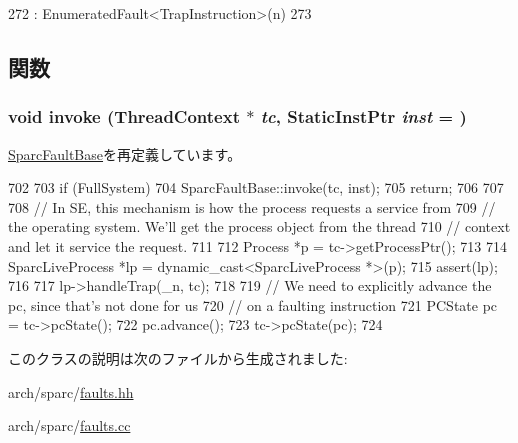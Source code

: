 \begin{DoxyCode}
272                                 : EnumeratedFault<TrapInstruction>(n)
273     {}
\end{DoxyCode}


\subsection{関数}
\hypertarget{classSparcISA_1_1TrapInstruction_a2bd783b42262278d41157d428e1f8d6f}{
\subsubsection[{invoke}]{\setlength{\rightskip}{0pt plus 5cm}void invoke ({\bf ThreadContext} $\ast$ {\em tc}, \/  {\bf StaticInstPtr} {\em inst} = {})}}
\label{classSparcISA_1_1TrapInstruction_a2bd783b42262278d41157d428e1f8d6f}


\hyperlink{classSparcISA_1_1SparcFaultBase_a2bd783b42262278d41157d428e1f8d6f}{SparcFaultBase}を再定義しています。


\begin{DoxyCode}
702 {
703     if (FullSystem) {
704         SparcFaultBase::invoke(tc, inst);
705         return;
706     }
707 
708     // In SE, this mechanism is how the process requests a service from
709     // the operating system. We'll get the process object from the thread
710     // context and let it service the request.
711 
712     Process *p = tc->getProcessPtr();
713 
714     SparcLiveProcess *lp = dynamic_cast<SparcLiveProcess *>(p);
715     assert(lp);
716 
717     lp->handleTrap(_n, tc);
718 
719     // We need to explicitly advance the pc, since that's not done for us
720     // on a faulting instruction
721     PCState pc = tc->pcState();
722     pc.advance();
723     tc->pcState(pc);
724 }
\end{DoxyCode}


このクラスの説明は次のファイルから生成されました:\begin{DoxyCompactItemize}
\item 
arch/sparc/\hyperlink{arch_2sparc_2faults_8hh}{faults.hh}\item 
arch/sparc/\hyperlink{arch_2sparc_2faults_8cc}{faults.cc}\end{DoxyCompactItemize}
